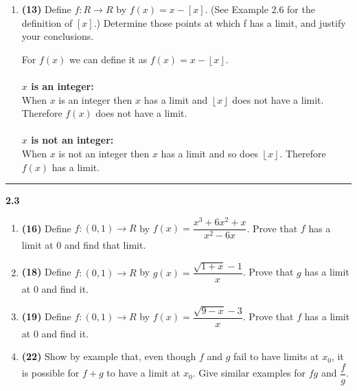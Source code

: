 \documentclass[fleqn]{article}
\begin{document}
\begin{enumerate}
    \item \textbf{(13)} Define $f: R \longrightarrow R$ by $f(x)=x-[x]$. (See Example 2.6 for the definition 
    of $[x]$.) Determine those points at which f has a limit, and justify your conclusions.

      \textcolor{hwColor}{
          For $f(x)$ we can define it as $f(x)=x-\left\lfloor x\right\rfloor$. 
          \\
          \\
          \textbf{$x$ is an integer:}
          \\
          When $x$ is an integer then $x$ has a limit and $\left\lfloor x\right\rfloor$ does not have a limit. 
          Therefore $f(x)$ does not have a limit.
          \\
          \\
          \textbf{$x$ is not an integer:}
          \\
          When $x$ is not an integer then $x$ has a limit and so does $\left\lfloor x\right\rfloor$. 
          Therefore $f(x)$ has a limit.
          \\
      }

  \end{enumerate}

  \rule{15cm}{2pt}

  \textbf{2.3}
  \begin{enumerate}
    \item \textbf{(16)} Define $f: (0, 1) \longrightarrow R$ by $f(x)=\dfrac{x^3+6x^2+x}{x^2-6x}$. Prove that $f$ 
    has a limit at $0$ and find that limit. 

        


    \item \textbf{(18)} Define $f: (0, 1) \longrightarrow R$ by $g(x)=\dfrac{\sqrt{1+x}-1}{x}$. Prove that $g$ has a limit
    at $0$ and find it.

        


    \item \textbf{(19)} Define $f: (0, 1) \longrightarrow R$ by $f(x)=\dfrac{\sqrt{9-x}-3}{x}$. Prove that $f$ has a limit 
    at $0$ and find it.

        


    \item \textbf{(22)} Show by example that, even though $f$ and $g$ fail to have limits at $x_0$, it is possible for
    $f+g$ to have a limit at $x_0$. Give similar examples for $fg$ and $\dfrac{f}{g}$.

        


  \end{enumerate}
\end{document}
